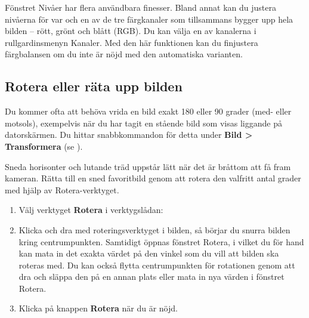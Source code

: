 \documentclass[a4paper,final]{memoir} %
\begin{document}
Fönstret Nivåer har flera användbara finesser. Bland annat kan du justera nivåerna för var och en av de tre färgkanaler som tillsammans bygger upp hela bilden -- rött, grönt och blått (RGB). Du kan välja en av kanalerna i rullgardinsmenyn Kanaler. Med den här funktionen kan du finjustera färgbalansen om du inte är nöjd med den automatiska varianten.

\subsection{Rotera eller räta upp bilden}


Du kommer ofta att behöva vrida en bild exakt 180 eller 90 grader (med- eller motsols), exempelvis när du har tagit en stående bild som visas liggande på datorskärmen. Du hittar snabbkommandon för detta under \textbf{Bild \textgreater{} Transformera} (se ). 


Sneda horisonter och lutande träd uppstår lätt när det är bråttom att få fram kameran. Rätta till en sned favoritbild genom att rotera den valfritt antal grader med hjälp av Rotera-verktyget.

\begin{enumerate}

\item Välj verktyget \textbf{Rotera} i verktygslådan:



\item Klicka och dra med roteringsverktyget i bilden, så börjar du snurra bilden kring centrumpunkten. Samtidigt öppnas fönstret Rotera, i vilket du
för hand kan mata in det exakta värdet på den vinkel som du vill att bilden ska roteras med. Du kan också flytta centrumpunkten för rotationen genom att dra och släppa den på en annan plats eller mata in nya värden i fönstret Rotera. 

\item Klicka på knappen \textbf{Rotera} när du är nöjd.

\end{enumerate}
\end{document}
